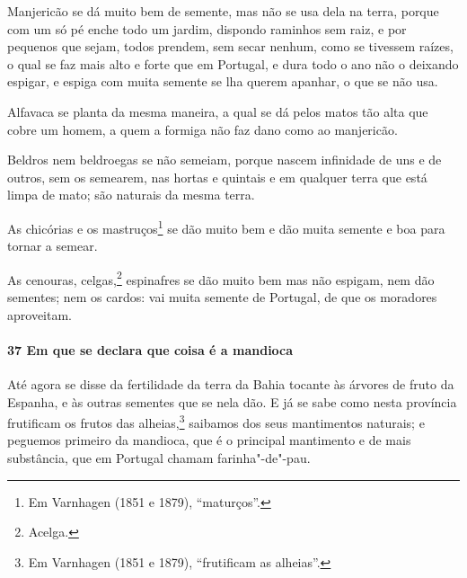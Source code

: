 Manjericão se dá muito bem de semente, mas não se usa dela na terra, porque com um só pé
enche todo um jardim, dispondo raminhos sem raiz, e por pequenos que sejam, todos prendem,
sem secar nenhum, como se tivessem raízes, o qual se faz mais alto e forte que em
Portugal, e dura todo o ano não o deixando espigar, e espiga com muita semente se lha
querem apanhar, o que se não usa.

Alfavaca se planta da mesma maneira, a qual se dá pelos matos tão alta que cobre um homem,
a quem a formiga não faz dano como ao manjericão.

Beldros nem beldroegas se não semeiam, porque nascem infinidade de uns e de outros, sem os
semearem, nas hortas e quintais e em qualquer terra que está limpa de mato; são naturais
da mesma terra.

As chicórias e os mastruços\footnote{ Em Varnhagen (1851 e 1879), ``maturços''.} se dão
muito bem e dão muita semente e boa para tornar a semear.

As cenouras, celgas,\footnote{ Acelga.} espinafres se dão muito bem mas não espigam, nem
dão sementes; nem os cardos: vai muita semente de Portugal, de que os moradores
aproveitam.

\paragraph{37 Em que se declara que coisa é a mandioca}

Até agora se disse da fertilidade da terra da Bahia tocante às árvores de fruto da
Espanha, e às outras sementes que se nela dão. E já se sabe como nesta província
frutificam os frutos das alheias,\footnote{ Em Varnhagen (1851 e 1879), ``frutificam as
alheias''.} saibamos dos seus mantimentos naturais; e peguemos primeiro da mandioca, que é
o principal mantimento e de mais substância, que em Portugal chamam farinha"-de"-pau.

